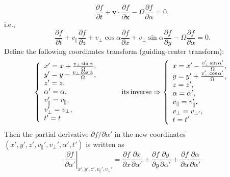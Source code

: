 \documentclass{article}
\newcommand{\tmop}[1]{\ensuremath{\operatorname{#1}}}
\begin{document}
\begin{equation}
  \frac{\partial f}{\partial t} +\mathbf{v} \cdot \frac{\partial f}{\partial
  \mathbf{x}} - \Omega \frac{\partial f}{\partial \alpha} = 0,
\end{equation}
i.e.,
\begin{equation}
  \label{22-11-16-1} \frac{\partial f}{\partial t} + v_{\parallel}
  \frac{\partial f}{\partial z} + v_{\perp} \cos \alpha \frac{\partial
  f}{\partial x} + v_{\perp} \sin \alpha \frac{\partial f}{\partial y} -
  \Omega \frac{\partial f}{\partial \alpha} = 0.
\end{equation}
Define the following coordinates transform (guiding-center transform):
\begin{equation}
  \left\{ \begin{array}{l}
    x' = x + \frac{v_{\perp} \sin \alpha}{\Omega},\\
    y' = y - \frac{v_{\perp} \cos \alpha}{\Omega},\\
    z' = z,\\
    \alpha' = \alpha,\\
    v_{\parallel}' = v_{\parallel},\\
    v_{\perp}' = v_{\perp},\\
    t' = t
  \end{array} \right. \hspace{2.8em} \tmop{its} \tmop{inverse} \Rightarrow
  \left\{ \begin{array}{l}
    x = x' - \frac{v_{\perp}' \sin \alpha'}{\Omega},\\
    y = y' + \frac{v_{\perp}' \cos \alpha'}{\Omega},\\
    z = z',\\
    \alpha = \alpha',\\
    v_{\parallel} = v_{\parallel}',\\
    v_{\perp} = v_{\perp'},\\
    t = t'
  \end{array} \right.
\end{equation}
Then the partial derivative $\partial f / \partial \alpha'$ in the new
coordinates $(x', y', z', v_{\parallel}', v_{\perp}', \alpha', t')$ is written
as
\begin{equation}
  \label{22-12-6-3} \left. \frac{\partial f}{\partial \alpha'} \right|_{x',
  y', z', v_{\parallel}', v_{\perp}'} = \frac{\partial f}{\partial x} 
  \frac{\partial x}{\partial \alpha'} + \frac{\partial f}{\partial y} 
  \frac{\partial y}{\partial \alpha'} + \frac{\partial f}{\partial \alpha} 
  \frac{\partial \alpha}{\partial \alpha'}
\end{equation}
\end{document}
